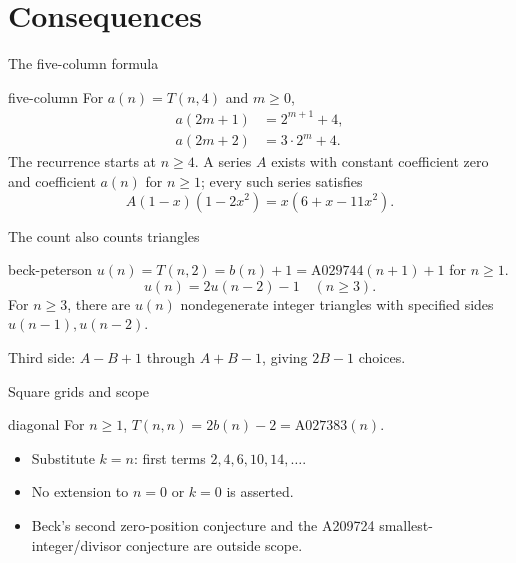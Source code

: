 \documentclass{beamer}
\begin{document}
\section{Consequences}
\begin{frame}{The five-column formula}
\begin{bookresult}{five-column}
For $a(n)=T(n,4)$ and $m\geq0$,
\[
\begin{aligned}
a(2m+1)&=2^{m+1}+4,\\
a(2m+2)&=3\cdot2^m+4.
\end{aligned}
\]
The recurrence starts at $n\geq4$. A series $A$ exists with constant coefficient zero and coefficient $a(n)$ for $n\geq1$; every such series satisfies
\[
A(1-x)(1-2x^2)=x(6+x-11x^2).
\]
\end{bookresult}
\end{frame}
\begin{frame}{The count also counts triangles}
\begin{bookresult}{beck-peterson}
$u(n)=T(n,2)=b(n)+1=\mathrm{A029744}(n+1)+1$ for $n\geq1$.
\[
u(n)=2u(n-2)-1\quad(n\geq3).
\]
For $n\geq3$, there are $u(n)$ nondegenerate integer triangles with specified sides $u(n-1),u(n-2)$.
\end{bookresult}
Third side: $A-B+1$ through $A+B-1$, giving $2B-1$ choices.
\end{frame}
\begin{frame}{Square grids and scope}
\begin{bookresult}{diagonal}
For $n\geq1$, $T(n,n)=2b(n)-2=\mathrm{A027383}(n)$.
\end{bookresult}
\begin{itemize}
\item Substitute $k=n$: first terms $2,4,6,10,14,\ldots$.
\item No extension to $n=0$ or $k=0$ is asserted.
\item Beck's second zero-position conjecture and the A209724 smallest-integer/divisor conjecture are outside scope.
\end{itemize}
\end{frame}
\end{document}
